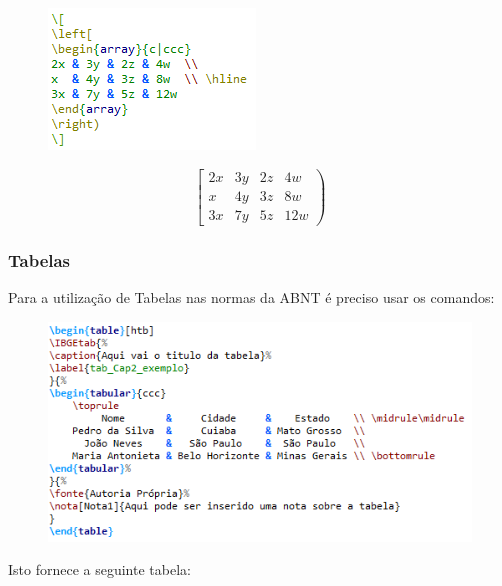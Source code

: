\begin{figure}[htb]
	\begin{center}
		\includegraphics[scale=1]{./Imagens/capitulo_2/code_3.png}
	\end{center}
\end{figure}

\[
\left[
\begin{array}{c|ccc}
2x & 3y & 2z & 4w  \\
x  & 4y & 3z & 8w  \\ \hline
3x & 7y & 5z & 12w
\end{array}
\right)
\]

\subsubsection{Tabelas}
Para a utilização de Tabelas nas normas da ABNT é preciso usar os comandos:

\begin{figure}[htb]
	\begin{center}
		\includegraphics[scale=1]{./Imagens/capitulo_2/code_4.png}
	\end{center}
\end{figure}

Isto fornece a seguinte tabela:

\begin{table}[htb]
\end{table}


